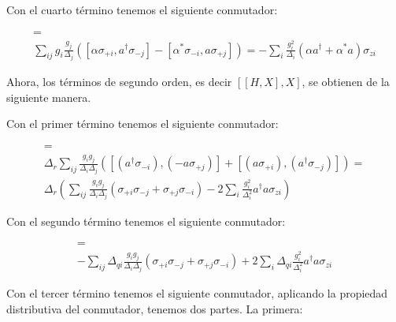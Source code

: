 Con el cuarto término tenemos el siguiente conmutador:

\begin{multline}
[\sum\limits_i g_i (\alpha \sigma_{+i} + \alpha^* \sigma_{-i}), \sum\limits_i \frac{g_i} {\Delta_i} (a^\dagger \sigma_{-i} - a \sigma_{+i})] =\\
\sum\limits_{ij} g_i \frac{g_j} {\Delta_j} \left([\alpha \sigma_{+i}, a^\dagger \sigma_{-j}] - [\alpha^* \sigma_{-i}, a \sigma_{+j}]\right) =
- \sum\limits_i \frac{g_i^2} {\Delta_i} (\alpha a^\dagger + \alpha^* a) \sigma_{zi}
\end{multline}

Ahora, los términos de segundo orden, es decir $[[H,X],X]$, se obtienen de la siguiente manera.

Con el primer término tenemos el siguiente conmutador:

\begin{multline}
    [\Delta_r \sum\limits_i \frac{g_i} {\Delta_i} (a^\dagger \sigma_{-i} + a \sigma_{+i}), \sum\limits_j \frac{g_j} {\Delta_j} (a^\dagger \sigma_{-j} - a \sigma_{+j})] = \\
    \Delta_r \sum\limits_{ij} \frac{g_i g_j}{\Delta_i \Delta_j} \left([(a^\dagger \sigma_{-i} ), (- a \sigma_{+j})] + 
        [(a \sigma_{+i}), (a^\dagger \sigma_{-j} )]\right) = \\
\Delta_r \left(\sum\limits_{ij} \frac{g_i g_j}{\Delta_i \Delta_j} \left(\sigma_{+i} \sigma_{-j} + \sigma_{+j} \sigma_{-i}\right) -
2 \sum\limits_{i} \frac{g_i^2}{\Delta_i^2} a^\dagger a \sigma_{zi} \right)
\end{multline}

Con el segundo término tenemos el siguiente conmutador:

\begin{multline}
    [- \sum\limits_i \frac{g_i} {\Delta_i} \Delta_{qi} (a^\dagger \sigma_{-i} + a \sigma_{+i}), \sum\limits_j \frac{g_j} {\Delta_j} (a^\dagger \sigma_{-j} - a \sigma_{+j})] = \\
- \sum\limits_{ij} \Delta_{qi}  \frac{g_i g_j}{\Delta_i \Delta_j} \left(\sigma_{+i} \sigma_{-j} + \sigma_{+j} \sigma_{-i}\right) +
2 \sum\limits_{i} \Delta_{qi} \frac{g_i^2}{\Delta_i^2} a^\dagger a \sigma_{zi}
\end{multline}

Con el tercer término tenemos el siguiente conmutador, aplicando la propiedad distributiva del conmutador, tenemos dos partes. La primera:

